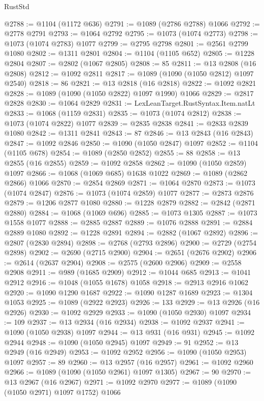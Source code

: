 \begin{lexlean}{RustStd}
\begin{coremodule}
@2788 := @1104 (@1172 @636)
@2791 := @1089 (@2786 @2788) @1066
@2792 := @2778 @2791
@2793 := @1064 @2792
@2795 := @1073 (@1074 @2773)
@2798 := @1073 (@1074 @2783) @1077
@2799 := @2795 @2798
@2801 := @2561 @2799 @1080
@2802 := @1311 @2801
@2804 := @1104 (@1105 @652)
@2805 := @1228 @2804
@2807 := @2802 (@1067 @2805)
@2808 := 85
@2811 := @13 @2808 (@16 @2808)
@2812 := @1092 @2811
@2817 := @1089 (@1090 (@1050 @2812) @1097 @2540)
@2818 := 86
@2821 := @13 @2818 (@16 @2818)
@2822 := @1092 @2821
@2828 := @1089 (@1090 (@1050 @2822) @1097 @1990) @1066
@2829 := @2817 @2828
@2830 := @1064 @2829
@2831 := LexLeanTarget.RustSyntax.Item.natLt
@2833 := @1068 (@1159 @2831)
@2835 := @1073 (@1074 @2812)
@2838 := @1073 (@1074 @2822) @1077
@2839 := @2835 @2838
@2841 := @2833 @2839 @1080
@2842 := @1311 @2841
@2843 := 87
@2846 := @13 @2843 (@16 @2843)
@2847 := @1092 @2846
@2850 := @1090 (@1050 @2847) @1097
@2852 := @1104 (@1105 @678)
@2854 := @1089 (@2850 @2852)
@2855 := 88
@2858 := @13 @2855 (@16 @2855)
@2859 := @1092 @2858
@2862 := @1090 (@1050 @2859) @1097
@2866 := @1068 (@1069 @685) @1638 @1022
@2869 := @1089 (@2862 @2866) @1066
@2870 := @2854 @2869
@2871 := @1064 @2870
@2873 := @1073 (@1074 @2847)
@2876 := @1073 (@1074 @2859) @1077
@2877 := @2873 @2876
@2879 := @1206 @2877 @1080
@2880 := @1228 @2879
@2882 := @2842 (@2871 @2880)
@2884 := @1068 (@1069 @696)
@2885 := @1073 @1305
@2887 := @1073 @1558 @1077
@2888 := @2885 @2887
@2889 := @1076 @2888
@2891 := @2884 @2889 @1080
@2892 := @1228 @2891
@2894 := @2882 (@1067 @2892)
@2896 := @2807 (@2830 @2894)
@2898 := @2768 (@2793 @2896)
@2900 := @2729 (@2754 @2898)
@2902 := @2690 (@2715 @2900)
@2904 := @2651 (@2676 @2902)
@2906 := @2614 (@2637 @2904)
@2908 := @2575 (@2600 @2906)
@2909 := @2558 @2908
@2911 := @989 (@1685 @2909)
@2912 := @1044 @685
@2913 := @1041 @2912
@2916 := @1048 (@1055 @1678) @1058
@2918 := @2913 @2916 @1062
@2920 := @1090 @1290 @1687
@2922 := @1090 @1287 @1689
@2923 := @1304 @1053
@2925 := @1089 (@2922 @2923)
@2926 := 133
@2929 := @13 @2926 (@16 @2926)
@2930 := @1092 @2929
@2933 := @1090 (@1050 @2930) @1097
@2934 := 109
@2937 := @13 @2934 (@16 @2934)
@2938 := @1092 @2937
@2941 := @1090 (@1050 @2938) @1097
@2944 := @13 @931 (@16 @931)
@2945 := @1092 @2944
@2948 := @1090 (@1050 @2945) @1097
@2949 := 91
@2952 := @13 @2949 (@16 @2949)
@2953 := @1092 @2952
@2956 := @1090 (@1050 @2953) @1097
@2957 := 89
@2960 := @13 @2957 (@16 @2957)
@2961 := @1092 @2960
@2966 := @1089 (@1090 (@1050 @2961) @1097 @1305)
@2967 := 90
@2970 := @13 @2967 (@16 @2967)
@2971 := @1092 @2970
@2977 := @1089 (@1090 (@1050 @2971) @1097 @1752) @1066

\end{coremodule}
\end{lexlean}
